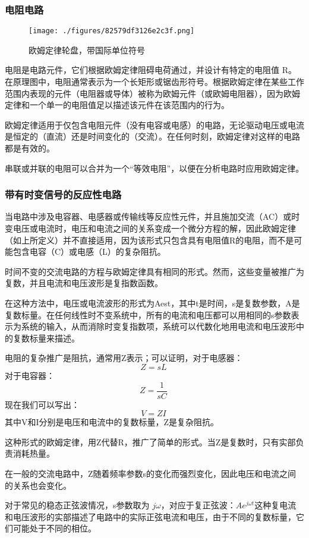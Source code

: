 \subsubsection{电阻电路}
\begin{figure}[ht]
\centering
\texttt{[image: ./figures/82579df3126e2c3f.png]}
\caption{欧姆定律轮盘，带国际单位符号} \label{fig_OuMu_7}
\end{figure}
电阻是电路元件，它们根据欧姆定律阻碍电荷通过，并设计有特定的电阻值 R。在原理图中，电阻通常表示为一个长矩形或锯齿形符号。根据欧姆定律在某些工作范围内表现的元件（电阻器或导体）被称为欧姆元件（或欧姆电阻器），因为欧姆定律和一个单一的电阻值足以描述该元件在该范围内的行为。

欧姆定律适用于仅包含电阻元件（没有电容或电感）的电路，无论驱动电压或电流是恒定的（直流）还是时间变化的（交流）。在任何时刻，欧姆定律对这样的电路都是有效的。

串联或并联的电阻可以合并为一个“等效电阻”，以便在分析电路时应用欧姆定律。
\subsubsection{带有时变信号的反应性电路}
当电路中涉及电容器、电感器或传输线等反应性元件，并且施加交流（AC）或时变电压或电流时，电压和电流之间的关系变成一个微分方程的解，因此欧姆定律（如上所定义）并不直接适用，因为该形式只包含具有电阻值R的电阻，而不是可能包含电容（C）或电感（L）的复杂阻抗。

时间不变的交流电路的方程与欧姆定律具有相同的形式。然而，这些变量被推广为复数，并且电流和电压波形是复指数函数。

在这种方法中，电压或电流波形的形式为Aest，其中t是时间，s是复数参数，A是复数标量。在任何线性时不变系统中，所有的电流和电压都可以用相同的s参数表示为系统的输入，从而消除时变复指数项，系统可以代数化地用电流和电压波形中的复数标量来描述。

电阻的复杂推广是阻抗，通常用Z表示；可以证明，对于电感器：
\[
Z = sL~
\]
对于电容器：
\[
Z = \frac{1}{sC}~
\]
现在我们可以写出：
\[
V = Z I~
\]
其中V和I分别是电压和电流中的复数标量，Z是复杂阻抗。

这种形式的欧姆定律，用Z代替R，推广了简单的形式。当Z是复数时，只有实部负责消耗热量。

在一般的交流电路中，Z随着频率参数s的变化而强烈变化，因此电压和电流之间的关系也会变化。

对于常见的稳态正弦波情况，s参数取为 \( j\omega \)，对应于复正弦波：\(Ae^{j\omega t}\)这种复电流和电压波形的实部描述了电路中的实际正弦电流和电压，由于不同的复数标量，它们可能处于不同的相位。
